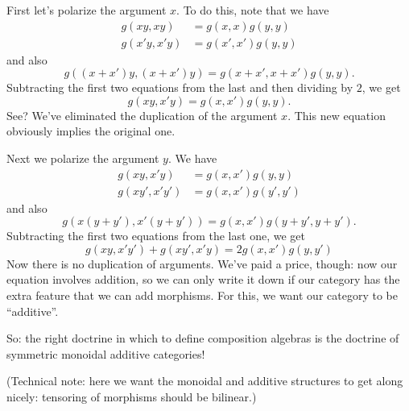\documentclass{article}
\begin{document}
First let's polarize the argument \(x\). To do this, note that we have
\[
  \begin{aligned}
    g(xy,xy) &= g(x,x) g(y,y)
  \\g(x'y,x'y) &= g(x',x') g(y,y)
  \end{aligned}
\] and also \[g((x+x')y,(x+x')y) = g(x+x',x+x') g(y,y).\] Subtracting
the first two equations from the last and then dividing by \(2\), we get
\[g(xy,x'y) = g(x,x') g(y,y).\] See? We've eliminated the duplication of
the argument \(x\). This new equation obviously implies the original
one.

Next we polarize the argument \(y\). We have \[
  \begin{aligned}
    g(xy,x'y) &= g(x,x') g(y,y)
  \\g(xy',x'y') &= g(x,x') g(y',y')
  \end{aligned}
\] and also \[g(x(y+y'),x'(y+y')) = g(x,x') g(y+y',y+y').\] Subtracting
the first two equations from the last one, we get
\[g(xy,x'y') + g(xy',x'y) = 2 g(x,x') g(y,y')\] Now there is no
duplication of arguments. We've paid a price, though: now our equation
involves addition, so we can only write it down if our category has the
extra feature that we can add morphisms. For this, we want our category
to be ``additive''.

So: the right doctrine in which to define composition algebras is the
doctrine of symmetric monoidal additive categories!

(Technical note: here we want the monoidal and additive structures to
get along nicely: tensoring of morphisms should be bilinear.)
\end{document}
